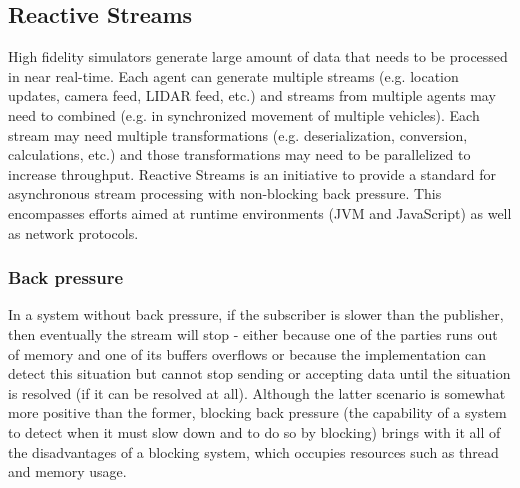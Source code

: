 \documentclass{article}
\let\cite\citep
\begin{document}
\subsection{Reactive Streams}


High fidelity simulators generate large amount of data that needs to be processed in near real-time. Each agent can generate multiple streams (e.g. location updates, camera feed, LIDAR feed, etc.) and streams from multiple agents may need to combined (e.g. in synchronized movement of multiple vehicles). Each stream may need multiple transformations (e.g. deserialization, conversion, calculations, etc.) and those transformations may need to be parallelized to increase throughput.
Reactive Streams is an initiative to provide a standard for asynchronous stream processing with non-blocking back pressure. This encompasses efforts aimed at runtime environments (JVM and JavaScript) as well as network protocols. \cite{reactive-manifesto} 

\subsubsection{Back pressure}
In a system without back pressure, if the subscriber is slower than the publisher, then eventually the stream will stop - either because one of the parties runs out of memory and one of its buffers overflows or because the implementation can detect this situation but cannot  stop sending or accepting data until the situation is resolved (if it can be resolved at all). Although the latter scenario is somewhat more positive than the former, blocking back pressure (the capability of a system to detect when it must slow down and to do so by blocking) brings with it all of the disadvantages of a blocking system, which occupies resources such as thread and memory usage. \cite{reactive-web-apps}
\end{document}
